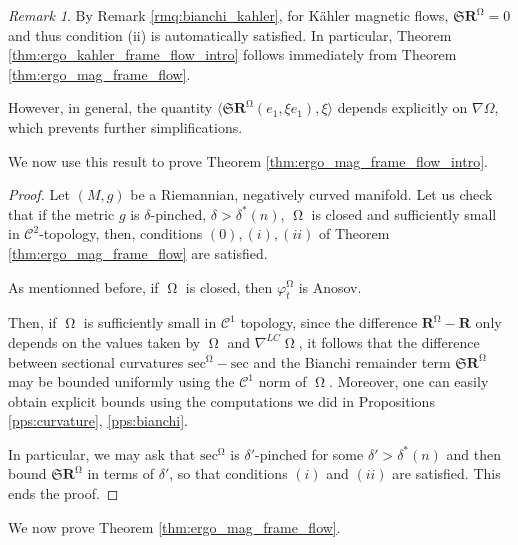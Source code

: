 \documentclass[12pt]{amsart}
\numberwithin{numbering}{section}
\theoremstyle{plain}
\theoremstyle{definition}
\theoremstyle{remark}
\newtheorem{rmq}[numbering]{Remark}
\numberwithin{equation}{section}
\DeclareMathOperator{\mg}{\Omega}
\newcommand{\rfm}{\mathbf{R}}
\newcommand{\rsfm}{\mathbf{R}^{\mg}}
\newcommand{\frk}[1]{\mathfrak{#1}}
\begin{document}
\begin{rmq}
By Remark \ref{rmq:bianchi_kahler}, for Kähler magnetic flows, $\frk{S} \rsfm = 0$ and thus condition (ii) is automatically satisfied. In particular, Theorem \ref{thm:ergo_kahler_frame_flow_intro} follows immediately from Theorem \ref{thm:ergo_mag_frame_flow}.

However, in general, the quantity $\langle \frk{S} \rsfm (e_1, \xi e_1), \xi \rangle$ depends explicitly on $\nabla \Omega$, which prevents further simplifications.
\end{rmq}

We now use this result to prove Theorem \ref{thm:ergo_mag_frame_flow_intro}.

\begin{proof} Let $(M, g)$ be a Riemannian, negatively curved manifold. Let us check that if the metric $g$ is $\delta$-pinched, $\delta > \delta^*(n)$, $\mg$ is closed and sufficiently small in $\mathcal{C}^2$-topology, then, conditions $(0), (i), (ii)$ of Theorem \ref{thm:ergo_mag_frame_flow} are satisfied.

As mentionned before, if $\mg$ is closed, then $\varphi_t^{\mg}$ is Anosov.

Then, if $\mg$ is sufficiently small in $\mathcal{C}^1$ topology, since the difference $\rsfm - \rfm$ only depends on the values taken by $\mg$ and $\nabla^{LC} \mg$, it follows that the difference between sectional curvatures $\mathrm{sec}^{\mg} - \mathrm{sec}$ and the Bianchi remainder term $\frk{S} \rsfm$ may be bounded uniformly using the $\mathcal{C}^1$ norm of $\mg$. Moreover, one can easily obtain explicit bounds using the computations we did in Propositions \ref{pps:curvature}, \ref{pps:bianchi}. 

In particular, we may ask that $\mathrm{sec}^{\mg}$ is $\delta'$-pinched for some $\delta' > \delta^*(n)$ and then bound $\frk{S} \rsfm$ in terms of $\delta'$, so that conditions $(i)$ and $(ii)$ are satisfied. This ends the proof.
\end{proof}

\medskip 

We now prove Theorem \ref{thm:ergo_mag_frame_flow}.
\end{document}
